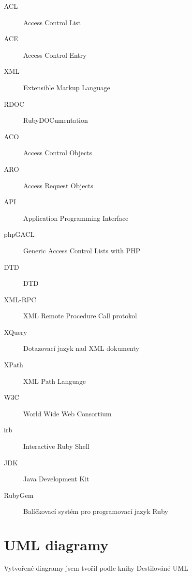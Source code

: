 \documentclass[11pt,twoside,a4paper]{book}
\begin{document}
\begin{description}
\item[ACL] Access Control List
\item[ACE] Access Control Entry
\item[XML] Extensible Markup Language
\item[RDOC] RubyDOCumentation
\item[ACO] Access Control Objects
\item[ARO] Access Request Objects
\item[API] Application Programming Interface
\item[phpGACL] Generic Access Control Lists with PHP
\item[DTD] DTD
\item[XML-RPC] XML Remote Procedure Call protokol
\item[XQuery] Dotazovací jazyk nad XML dokumenty
\item[XPath] XML Path Language
\item[W3C] World Wide Web Consortium
\item[irb] Interactive Ruby Shell
\item[JDK] Java Development Kit
\item[RubyGem] Balíčkovací systém pro programovací jazyk Ruby
\end{description}

\chapter{UML diagramy}

Vytvořené diagramy jsem tvořil podle knihy Destilováné UML \cite{UML}
\end{document}
